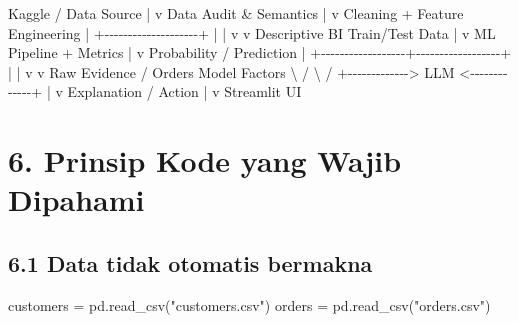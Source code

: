\documentclass[
  indonesian,
  letterpaper,
  DIV=11,
  numbers=noendperiod]{scrreprt}
\newenvironment{Shaded}{\begin{snugshade}}{\end{snugshade}}
\newcommand{\NormalTok}[1]{\textcolor[rgb]{0.00,0.23,0.31}{#1}}
\newcommand{\OperatorTok}[1]{\textcolor[rgb]{0.37,0.37,0.37}{#1}}
\newcommand{\StringTok}[1]{\textcolor[rgb]{0.13,0.47,0.30}{#1}}
\begin{document}
\begin{Shaded}
\begin{Highlighting}[]
\NormalTok{Kaggle / Data Source}
\NormalTok{        |}
\NormalTok{        v}
\NormalTok{Data Audit \& Semantics}
\NormalTok{        |}
\NormalTok{        v}
\NormalTok{Cleaning + Feature Engineering}
\NormalTok{        |}
\NormalTok{        +{-}{-}{-}{-}{-}{-}{-}{-}{-}{-}{-}{-}{-}{-}{-}{-}{-}{-}{-}{-}+}
\NormalTok{        |                    |}
\NormalTok{        v                    v}
\NormalTok{Descriptive BI          Train/Test Data}
\NormalTok{                             |}
\NormalTok{                             v}
\NormalTok{                    ML Pipeline + Metrics}
\NormalTok{                             |}
\NormalTok{                             v}
\NormalTok{                    Probability / Prediction}
\NormalTok{                             |}
\NormalTok{          +{-}{-}{-}{-}{-}{-}{-}{-}{-}{-}{-}{-}{-}{-}{-}{-}{-}{-}+{-}{-}{-}{-}{-}{-}{-}{-}{-}{-}{-}{-}{-}{-}{-}{-}{-}{-}+}
\NormalTok{          |                                     |}
\NormalTok{          v                                     v}
\NormalTok{Raw Evidence / Orders                    Model Factors}
\NormalTok{          \textbackslash{}                                     /}
\NormalTok{           \textbackslash{}                                   /}
\NormalTok{            +{-}{-}{-}{-}{-}{-}{-}{-}{-}{-}{-}{-}{-}\textgreater{} LLM \textless{}{-}{-}{-}{-}{-}{-}{-}{-}{-}{-}{-}{-}{-}+}
\NormalTok{                           |}
\NormalTok{                           v}
\NormalTok{                 Explanation / Action}
\NormalTok{                           |}
\NormalTok{                           v}
\NormalTok{                    Streamlit UI}
\end{Highlighting}
\end{Shaded}


\chapter{6. Prinsip Kode yang Wajib
Dipahami}\label{prinsip-kode-yang-wajib-dipahami}

\section{6.1 Data tidak otomatis
bermakna}\label{data-tidak-otomatis-bermakna}

\begin{Shaded}
\begin{Highlighting}[]
\NormalTok{customers }\OperatorTok{=}\NormalTok{ pd.read\_csv(}\StringTok{"customers.csv"}\NormalTok{)}
\NormalTok{orders }\OperatorTok{=}\NormalTok{ pd.read\_csv(}\StringTok{"orders.csv"}\NormalTok{)}
\end{Highlighting}
\end{Shaded}
\end{document}
